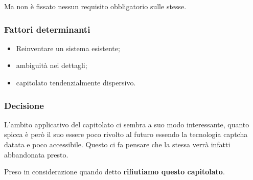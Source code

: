 Ma non è fissato nessun requisito obbligatorio sulle stesse.

\subsubsection{Fattori determinanti}
\begin{itemize}
    \item Reinventare un sistema esistente;
    \item ambiguità nei dettagli;
    \item capitolato tendenzialmente dispersivo.
\end{itemize}

\subsubsection{Decisione}
L'ambito applicativo del capitolato ci sembra a suo modo interessante, quanto spicca è però il suo essere poco rivolto al futuro essendo la tecnologia captcha datata e poco accessibile. Questo ci fa pensare che la stessa verrà infatti abbandonata presto.

Preso in considerazione quando detto \textbf{rifiutiamo questo capitolato}.
